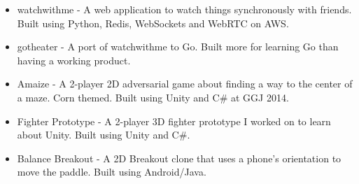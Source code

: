 \documentclass[a4paper]{article}
\begin{document}
        \begin{multicols}{2}
            \begin{itemize}
                \item watchwithme - A web application to watch things synchronously with friends. Built using Python, Redis, WebSockets and WebRTC on AWS.
                \item gotheater - A port of watchwithme to Go. Built more for learning Go than having a working product. 
                \item Amaize - A 2-player 2D adversarial game about finding a way to the center of a maze. Corn themed. Built using Unity and C\# at GGJ 2014.
                \item Fighter Prototype - A 2-player 3D fighter prototype I worked on to learn about Unity. Built using Unity and C\#.
                \item Balance Breakout - A 2D Breakout clone that uses a phone's orientation to move the paddle. Built using Android/Java.
            \end{itemize}
        \end{multicols}
    \endgroup
\end{document}
